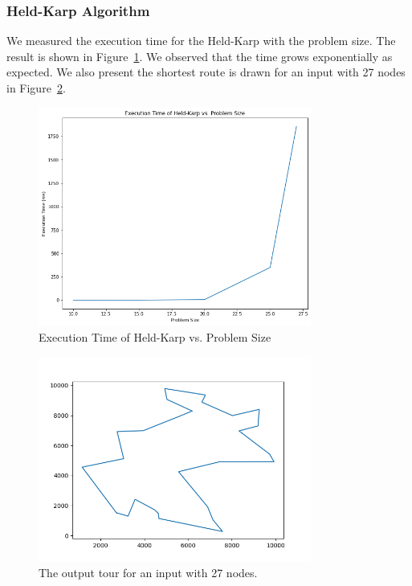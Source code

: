 \documentclass{article}
\begin{document}
\subsubsection{Held-Karp Algorithm}
We measured the execution time for the Held-Karp with the problem size. The result is shown in Figure~\ref{fig:hk_size}. We observed that the time grows exponentially as expected. We also present the shortest route is drawn for an input with 27 nodes in Figure~\ref{fig:hk_27}.
\begin{figure}
    \centering
    \includegraphics[width=0.8\textwidth]{hk_size.png}
    \caption{Execution Time of Held-Karp vs. Problem Size}
    \label{fig:hk_size}
\end{figure}
\begin{figure}
    \centering
    \includegraphics[width=0.8\textwidth]{hk_27.png}
    \caption{The output tour for an input with 27 nodes.}
    \label{fig:hk_27}
\end{figure}
\end{document}

